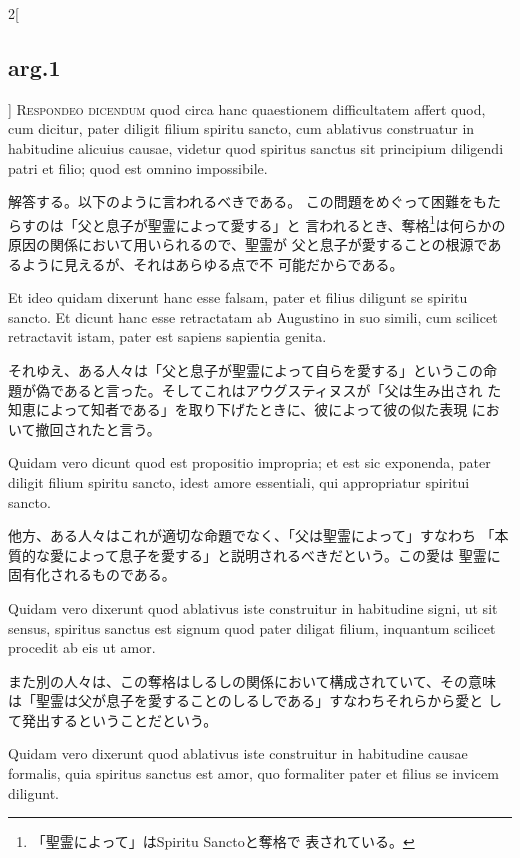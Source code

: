 \documentclass[paper=a4paper,fontsize=10pt,jafontsize=9pt,titlepage]{jlreq}
\begin{document}
\begin{paracol}{2}[\subsection{arg.1}]
{\scshape Respondeo dicendum} quod circa hanc quaestionem
 difficultatem affert quod, cum dicitur, pater diligit filium spiritu
 sancto, cum ablativus construatur in habitudine alicuius causae,
 videtur quod spiritus sanctus sit principium diligendi patri et
 filio; quod est omnino impossibile.

\switchcolumn

解答する。以下のように言われるべきである。
この問題をめぐって困難をもたらすのは「父と息子が聖霊によって愛する」と
 言われるとき、奪格\footnote{「聖霊によって」はSpiritu Sanctoと奪格で
 表されている。}は何らかの原因の関係において用いられるので、聖霊が
 父と息子が愛することの根源であるように見えるが、それはあらゆる点で不
 可能だからである。

\switchcolumn*

Et ideo quidam dixerunt hanc esse
 falsam, pater et filius diligunt se spiritu sancto. Et dicunt hanc
 esse retractatam ab Augustino in suo simili, cum scilicet retractavit
 istam, pater est sapiens sapientia genita.

\switchcolumn

それゆえ、ある人々は「父と息子が聖霊によって自らを愛する」というこの命
 題が偽であると言った。そしてこれはアウグスティヌスが「父は生み出され
 た知恵によって知者である」を取り下げたときに、彼によって彼の似た表現
 において撤回されたと言う。

\switchcolumn*

Quidam vero dicunt quod
 est propositio impropria; et est sic exponenda, pater diligit filium
 spiritu sancto, idest amore essentiali, qui appropriatur spiritui
 sancto.

\switchcolumn

他方、ある人々はこれが適切な命題でなく、「父は聖霊によって」すなわち
 「本質的な愛によって息子を愛する」と説明されるべきだという。この愛は
 聖霊に固有化されるものである。

\switchcolumn*

Quidam vero dixerunt quod ablativus iste construitur in
 habitudine signi, ut sit sensus, spiritus sanctus est signum quod
 pater diligat filium, inquantum scilicet procedit ab eis ut
 amor.

\switchcolumn

また別の人々は、この奪格はしるしの関係において構成されていて、その意味
 は「聖霊は父が息子を愛することのしるしである」すなわちそれらから愛と
 して発出するということだという。

\switchcolumn*

Quidam vero dixerunt quod ablativus iste construitur in
 habitudine causae formalis, quia spiritus sanctus est amor, quo
 formaliter pater et filius se invicem diligunt.


\end{paracol}
\end{document}
